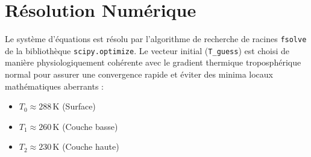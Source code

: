 \documentclass[11pt,a4paper]{article}
\begin{document}
\section{Résolution Numérique}
Le système d'équations est résolu par l'algorithme de recherche de racines \texttt{fsolve} de la bibliothèque \texttt{scipy.optimize}. Le vecteur initial (\texttt{T\_guess}) est choisi de manière physiologiquement cohérente avec le gradient thermique troposphérique normal pour assurer une convergence rapide et éviter des minima locaux mathématiques aberrants :
\begin{itemize}
    \item $T_0 \approx 288 \, \text{K}$ (Surface)
    \item $T_1 \approx 260 \, \text{K}$ (Couche basse)
    \item $T_2 \approx 230 \, \text{K}$ (Couche haute)
\end{itemize}
\end{document}
